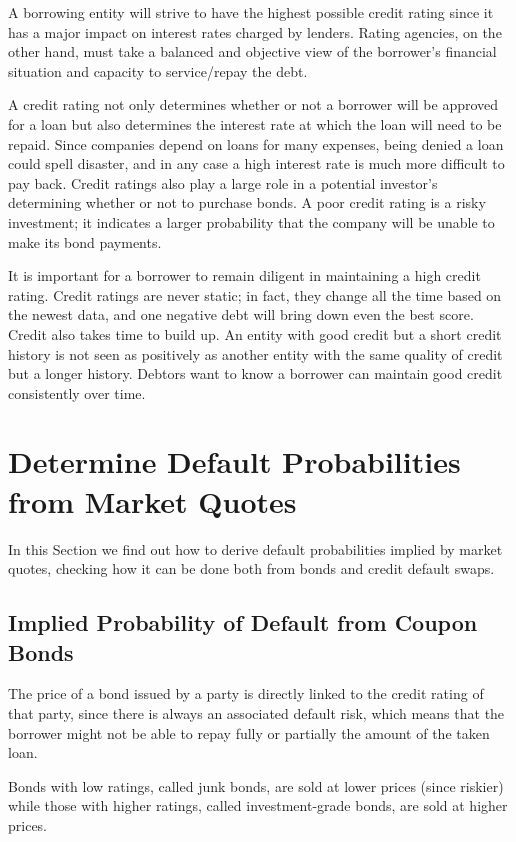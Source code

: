 A borrowing entity will strive to have the highest possible credit
rating since it has a major impact on interest rates charged by lenders.
Rating agencies, on the other hand, must take a balanced and objective
view of the borrower's financial situation and capacity to service/repay
the debt.

A credit rating not only determines whether or not a borrower will be
approved for a loan but also determines the interest rate at which the
loan will need to be repaid. Since companies depend on loans for many
expenses, being denied a loan could spell disaster, and
in any case a high interest rate is much more difficult to pay back.
Credit ratings also play a large role in a potential investor's
determining whether or not to purchase bonds. A poor credit rating is a
risky investment; it indicates a larger probability that the company
will be unable to make its bond payments.

It is important for a borrower to remain diligent in maintaining a high
credit rating. Credit ratings are never static; in fact, they change all
the time based on the newest data, and one negative debt will bring down
even the best score. 
Credit also takes time to build up. An entity with
good credit but a short credit history is not seen as positively as
another entity with the same quality of credit but a longer history.
Debtors want to know a borrower can maintain good credit consistently
over time.

\section{Determine Default Probabilities from Market Quotes}
In this Section we find out how to derive default probabilities implied by market quotes, checking how it can be done both from bonds and credit default swaps.

\subsection{Implied Probability of Default from Coupon Bonds}\label{default-probabilities-and-bond-prices}

The price of a bond issued by a party is directly linked to the credit
rating of that party, since there is always an associated default risk, which means that the borrower might not be able to repay
fully or partially the amount of the taken loan. 

Bonds with low ratings, called junk bonds, are sold at lower prices (since riskier) while those with higher ratings, called investment-grade bonds, are sold at higher prices.

